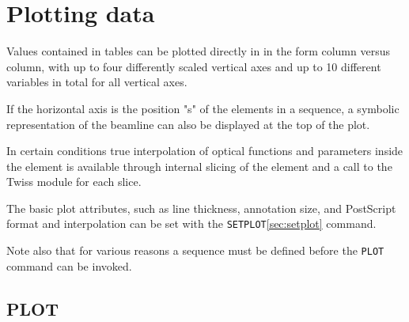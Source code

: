 
\chapter{Plotting data}
\label{chap:plot}

Values contained in \madx tables can be plotted directly in \madx in the
form column versus column, with up to four differently scaled vertical
axes and up to 10 different variables in total for all vertical axes.

If the horizontal axis is the position "s" of the elements
in a sequence, a symbolic representation of the beamline can also
be displayed at the top of the plot. 

In certain conditions true interpolation of optical functions and
parameters inside the element is available through internal slicing of
the element and a call to the Twiss module for each slice. 

The basic plot attributes, such as line thickness, annotation size,
and PostScript format and interpolation can be set with the
\texttt{SETPLOT}\ref{sec:setplot} command.   

Note also that for various reasons a sequence must be defined before the 
\texttt{PLOT} command can be invoked. 

\section{PLOT}	
\label{sec:plot}




